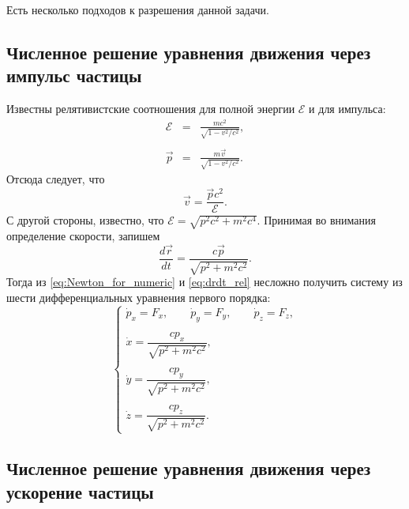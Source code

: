 Есть несколько подходов к разрешения данной задачи.

\subsection{Численное решение уравнения движения через импульс частицы}


Известны релятивистские соотношения для полной энергии $\mathscr{E}$ и для импульса:
\begin{eqnarray*}
	\mathscr{E} &=& \frac{mc^2}{\sqrt{1 - v^2/c^2}},\\ \nonumber \\
	\vec{p} &=& \frac{m\vec{v}}{\sqrt{1 - v^2/c^2}}.
\end{eqnarray*}
Отсюда следует, что
\begin{equation}
	\vec{v} = \frac{\vec{p}c^2}{\mathscr{E}}.
\end{equation}
С другой стороны, известно, что $\mathscr{E} = \sqrt{p^2c^2 + m^2 c^4}$.
Принимая во внимания определение скорости, запишем
\begin{equation}
	\frac{d\vec{r}}{dt} = \frac{c \vec{p}}{\sqrt{p^2 + m^2 c^2}}.
	\label{eq:drdt_rel}
\end{equation}
Тогда из \eqref{eq:Newton_for_numeric} и \eqref{eq:drdt_rel} несложно получить систему из шести дифференциальных уравнения первого порядка:
\begin{equation}
	\begin{cases}
	\dot{p}_x = F_x, \qquad \dot{p}_y = F_y, \qquad \dot{p}_z = F_z, \\ \\
	\dot{x} = \dfrac{c p_x}{\sqrt{p^2 + m^2 c^2}}, \\ \\
	\dot{y} = \dfrac{c p_y}{\sqrt{p^2 + m^2 c^2}}, \\ \\
	\dot{z} = \dfrac{c p_z}{\sqrt{p^2 + m^2 c^2}}.
	\end{cases}
	\label{eq:style1}
\end{equation}

\subsection{Численное решение уравнения движения через ускорение частицы}

